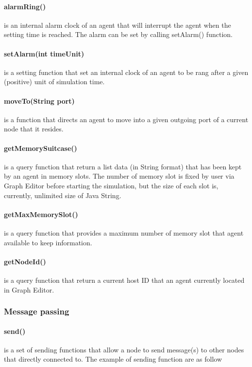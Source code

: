 \paragraph{alarmRing()} is an internal alarm clock of an agent that will interrupt the agent when the setting time is reached. The alarm can be set by calling setAlarm() function.

\paragraph{setAlarm(int timeUnit)} is a setting function that set an internal clock of an agent to be rang after a given (positive) unit of simulation time.

\paragraph{moveTo(String port)} is a function that directs an agent to move into a given outgoing port of a current node that it resides.

\paragraph{getMemorySuitcase()} is a query function that return a list data (in String format) that has been kept by an agent in memory slots. The number of memory slot is fixed by user via Graph Editor before starting the simulation, but the size of each slot is, currently, unlimited size of Java String.

\paragraph{getMaxMemorySlot()} is a query function that provides a maximum number of memory slot that agent available to keep information.

\paragraph{getNodeId()} is a query function that return a current host ID that an agent currently located in Graph Editor.


\subsubsection*{Message passing}

\paragraph{send()} is a set of sending functions that allow a node to send message(s) to other nodes that directly connected to. The example of sending function are as follow

